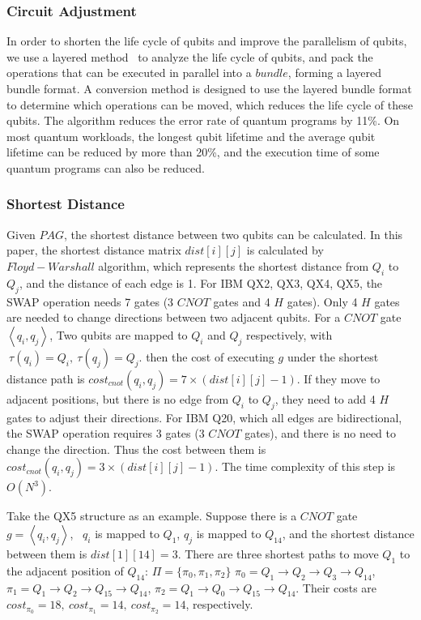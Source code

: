 \documentclass[runningheads]{llncs}
\begin{document}
\subsubsection{Circuit Adjustment}
In order to shorten the life cycle of qubits and improve the parallelism of qubits, 
we use a layered method~\cite{2019Zhang} to analyze the life cycle of qubits, 
and pack the operations that can be executed in parallel into a $bundle$, forming a layered bundle format.
A conversion method is designed to use the layered bundle format to determine 
which operations can be moved, which reduces the life cycle of these qubits.
The algorithm reduces the error rate of quantum programs by 11\%. 
On most quantum workloads, the longest qubit lifetime and the average qubit lifetime 
can be reduced by more than 20\%, and the execution time of some quantum programs can also be reduced.
\subsubsection{Shortest Distance}
Given $PAG$, 
the shortest distance between two qubits can be calculated. 
In this paper, the shortest distance matrix $dist[i][j]$ is calculated by $Floyd-Warshall$ algorithm, 
which represents the shortest distance from $Q_{i}$ to $Q_{j}$, 
and the distance of each edge is 1. 
For IBM QX2, QX3, QX4, QX5, the SWAP operation needs 7 gates 
(3 $CNOT$ gates and 4 $H$ gates). 
Only 4 $H$ gates are needed to change directions between two adjacent qubits. 
For a $CNOT$ gate $\left \langle  q_{i},q_{j} \right \rangle $,
Two qubits are mapped to $Q_{i}$ and $Q_{j}$ respectively, with $\ \tau(q_{i})=Q_{i},\ \tau(q_{j})=Q_{j}$.
then the cost of executing $g$ under the shortest distance path is $cost_{cnot}(q_{i},q_{j})=7 \times( dist[i][j]-1)$.
If they move to adjacent positions, but there is no edge from $Q_{i}$ to $Q_{j}$,
they need to add 4 $H$ gates to adjust their directions.
For IBM Q20, which all edges are bidirectional, 
the SWAP operation requires 3 gates (3 $CNOT$ gates), 
and there is no need to change the direction. 
Thus the cost between them is $cost_{cnot}(q_{i},q_{j})=3 \times( dist[i][j]-1)$.
The time complexity of this step is $O (N^{3})$.
\begin{example}
	Take the QX5 structure as an example.
Suppose there is a $CNOT$ gate $g=\left \langle  q_{i}, q_{j} \right \rangle $, \ $q_{i}$ is mapped to $Q_{1}$, 
 $q_{j}$ is mapped to $Q_{14}$, 
and the shortest distance between them  is $dist[1][14]=3$.
There are three shortest paths to move $Q_{1}$ to the adjacent position of $Q_{14}$:
$\Pi=\{\pi_{0},\pi_{1},\pi_{2}\}$
$\pi_{0}={Q_{1}\rightarrow Q_{2} \rightarrow Q_{3} \rightarrow Q_{14}}$,
$\pi_{1}={Q_{1}\rightarrow Q_{2} \rightarrow Q_{15} \rightarrow Q_{14}}$,
$\pi_{2}={Q_{1}\rightarrow Q_{0} \rightarrow Q_{15} \rightarrow Q_{14}}$.
Their costs are 
$cost_{\pi_{0}}=18,\ cost_{\pi_{1}}=14,\ cost_{\pi_{2}}=14$, respectively.
\end{example}
\end{document}
